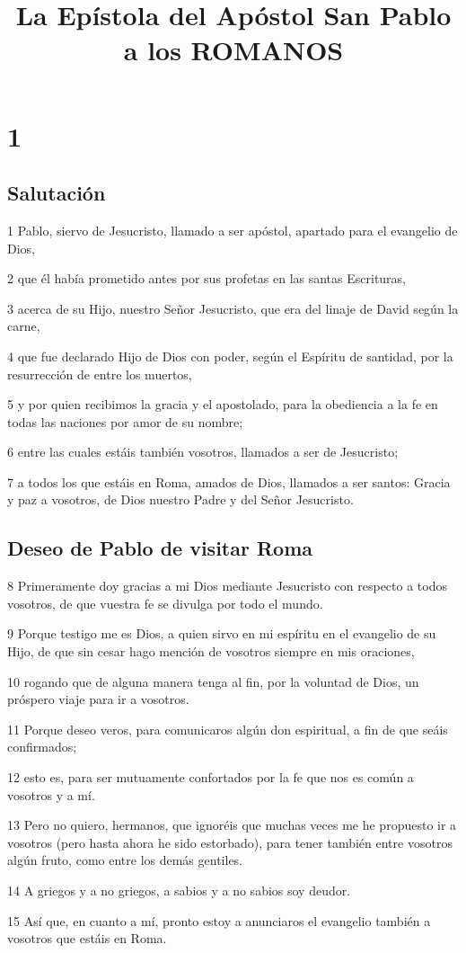 
\title{La Epístola del Apóstol San Pablo a los ROMANOS}

\chapter{1}

\section*{Salutación}

\par 1 Pablo, siervo de Jesucristo, llamado a ser apóstol, apartado para el evangelio de Dios,
\par 2 que él había prometido antes por sus profetas en las santas Escrituras,
\par 3 acerca de su Hijo, nuestro Señor Jesucristo, que era del linaje de David según la carne,
\par 4 que fue declarado Hijo de Dios con poder, según el Espíritu de santidad, por la resurrección de entre los muertos,
\par 5 y por quien recibimos la gracia y el apostolado, para la obediencia a la fe en todas las naciones por amor de su nombre;
\par 6 entre las cuales estáis también vosotros, llamados a ser de Jesucristo;
\par 7 a todos los que estáis en Roma, amados de Dios, llamados a ser santos: Gracia y paz a vosotros, de Dios nuestro Padre y del Señor Jesucristo.

\section*{Deseo de Pablo de visitar Roma}

\par 8 Primeramente doy gracias a mi Dios mediante Jesucristo con respecto a todos vosotros, de que vuestra fe se divulga por todo el mundo.
\par 9 Porque testigo me es Dios, a quien sirvo en mi espíritu en el evangelio de su Hijo, de que sin cesar hago mención de vosotros siempre en mis oraciones,
\par 10 rogando que de alguna manera tenga al fin, por la voluntad de Dios, un próspero viaje para ir a vosotros.
\par 11 Porque deseo veros, para comunicaros algún don espiritual, a fin de que seáis confirmados;
\par 12 esto es, para ser mutuamente confortados por la fe que nos es común a vosotros y a mí.
\par 13 Pero no quiero, hermanos, que ignoréis que muchas veces me he propuesto ir a vosotros (pero hasta ahora he sido estorbado), para tener también entre vosotros algún fruto, como entre los demás gentiles.
\par 14 A griegos y a no griegos, a sabios y a no sabios soy deudor.
\par 15 Así que, en cuanto a mí, pronto estoy a anunciaros el evangelio también a vosotros que estáis en Roma.


